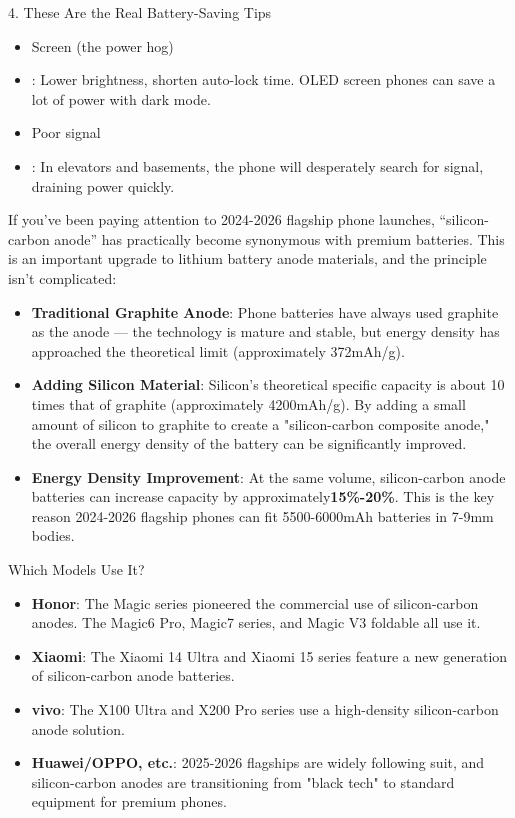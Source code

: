 \begin{tcbwarn}{4. These Are the Real Battery-Saving Tips}
\begin{itemize}
  \item Screen (the power hog)
  \item : Lower brightness, shorten auto-lock time. OLED screen phones can save a lot of power with dark mode.
  \item Poor signal
  \item : In elevators and basements, the phone will desperately search for signal, draining power quickly.
\end{itemize}

\end{tcbwarn}


If you've been paying attention to 2024-2026 flagship phone launches, “silicon-carbon anode” has practically become synonymous with premium batteries. This is an important upgrade to lithium battery anode materials, and the principle isn't complicated:

\begin{itemize}
  \item \textbf{Traditional Graphite Anode}: Phone batteries have always used graphite as the anode — the technology is mature and stable, but energy density has approached the theoretical limit (approximately 372mAh/g).
  \item \textbf{Adding Silicon Material}: Silicon's theoretical specific capacity is about 10 times that of graphite (approximately 4200mAh/g). By adding a small amount of silicon to graphite to create a "silicon-carbon composite anode," the overall energy density of the battery can be significantly improved.
  \item \textbf{Energy Density Improvement}: At the same volume, silicon-carbon anode batteries can increase capacity by approximately\textbf{15\%-20\%}. This is the key reason 2024-2026 flagship phones can fit 5500-6000mAh batteries in 7-9mm bodies.
\end{itemize}

\begin{tcbinfo}{Which Models Use It?}
\begin{itemize}
  \item \textbf{Honor}: The Magic series pioneered the commercial use of silicon-carbon anodes. The Magic6 Pro, Magic7 series, and Magic V3 foldable all use it.
  \item \textbf{Xiaomi}: The Xiaomi 14 Ultra and Xiaomi 15 series feature a new generation of silicon-carbon anode batteries.
  \item \textbf{vivo}: The X100 Ultra and X200 Pro series use a high-density silicon-carbon anode solution.
  \item \textbf{Huawei/OPPO, etc.}: 2025-2026 flagships are widely following suit, and silicon-carbon anodes are transitioning from "black tech" to standard equipment for premium phones.
\end{itemize}

\end{tcbinfo}

